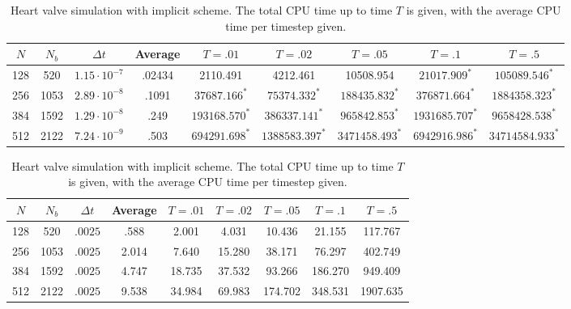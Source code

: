 \documentclass[preprint,12pt]{elsarticle}
\begin{document}
\begin{table}
\caption{Heart valve simulation with Forward Euler/Backward Euler scheme. The total CPU time up to time $T$ is given, with the average CPU time per timestep given. $^*$ denotes an extrapolated value.}
\label{table:ValveFEBESims}
\begin{center}
\begin{tabular}{|c||c c|c|c c c c c|}
\hline
$N$ & $N_b$ & $\Delta t$ & Average & $T=.01$ & $T=.02$ & $T=.05$ &$T=.1$ &$T=.5$\\
\hline
128 & 520 & $1.15\cdot 10^{-7}$ & .02434 & 2110.491 & 4212.461 & 10508.954 & $21017.909^*$ & $105089.546^*$ \\
256 & 1053 & $2.89\cdot 10^{-8}$ & .1091 & $37687.166^*$ & $75374.332^*$ & $188435.832^*$ & $376871.664^*$ & $1884358.323^*$ \\
384 & 1592 & $1.29\cdot 10^{-8}$ & .249 & $193168.570^*$ & $386337.141^*$ & $965842.853^*$ & $1931685.707^*$ & $9658428.538^*$ \\
512 & 2122 & $7.24\cdot 10^{-9}$ & .503 & $694291.698^*$ & $1388583.397^*$ & $3471458.493^*$ & $6942916.986^*$ & $34714584.933^*$\\
\hline
\end{tabular}
\end{center}

\caption{Heart valve simulation with implicit scheme. The total CPU time up to time $T$ is given, with the average CPU time per timestep given.}
\label{table:ValveImplicitSims}
\begin{center}
\begin{tabular}{|c||c c|c|c c c c c|}
\hline
$N$ & $N_b$ & $\Delta t$ & Average & $T=.01$ & $T=.02$ & $T=.05$ &$T=.1$ &$T=.5$\\
\hline
128 & 520 & $.0025$ & .588 & 2.001 & 4.031 & 10.436 & 21.155 & 117.767\\
256 & 1053 & $.0025$ & 2.014 & 7.640  & 15.280 & 38.171 & 76.297 & 402.749\\
384 & 1592 & $.0025$ & 4.747 & 18.735 & 37.532 & 93.266 & 186.270 & 949.409\\
512 & 2122 & $.0025$ & 9.538 & 34.984 & 69.983 & 174.702 & 348.531 & 1907.635\\
\hline
\end{tabular}
\end{center}

\end{table}
\end{document}

